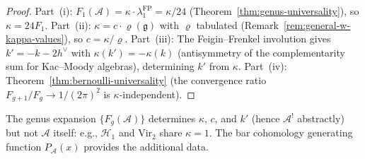 \begin{proof}
Part~(i): $F_1(\mathcal{A}) = \kappa \cdot \lambda_1^{\mathrm{FP}} = \kappa/24$
(Theorem~\ref{thm:genus-universality}), so $\kappa = 24 F_1$.
Part~(ii): $\kappa = c \cdot \varrho(\mathfrak{g})$ with $\varrho$ tabulated
(Remark~\ref{rem:general-w-kappa-values}), so $c = \kappa/\varrho$.
Part~(iii): The Feigin--Frenkel involution gives $k' = -k - 2h^\vee$ with
$\kappa(k') = -\kappa(k)$ (antisymmetry of the complementarity sum for
Kac--Moody algebras), determining $k'$ from $\kappa$.
Part~(iv): Theorem~\ref{thm:bernoulli-universality} (the convergence
ratio $F_{g+1}/F_g \to 1/(2\pi)^2$ is $\kappa$-independent).
\end{proof}

\begin{remark}
\label{rem:genus-complete-invariant}
The genus expansion $\{F_g(\mathcal{A})\}$ determines $\kappa$, $c$, and $k'$ (hence $\mathcal{A}^!$ abstractly) but not $\mathcal{A}$ itself: e.g., $\mathcal{H}_1$ and $\mathrm{Vir}_2$ share $\kappa = 1$.  The bar cohomology generating function $P_{\mathcal{A}}(x)$ provides the additional data.
\end{remark}


